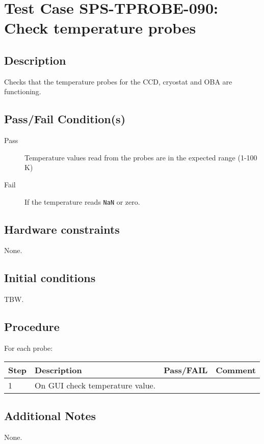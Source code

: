 \section{Test Case SPS-TPROBE-090: Check temperature probes}

\subsection{Description}

Checks that the temperature probes for the CCD, cryostat and OBA are functioning.

\subsection{Pass/Fail Condition(s)}

\begin{description}
\item [Pass] Temperature values read from the probes are in the expected range (1-100 K)
\item [Fail] If the temperature reads \texttt{NaN} or zero.
\end{description}

\subsection{Hardware constraints}

None.

\subsection{Initial conditions}

TBW.

\subsection{Procedure}

For each probe:

\begin{table}[H]
    \begin{tabular}{|l| p{5cm} |l| p{5cm} |}
    \hline
    {\bf Step} & {\bf Description} & {\bf Pass/FAIL} & {\bf Comment}  \\ \hline
    1 & On GUI check temperature value. &  &  \\ \hline
    \end{tabular}
\end{table}

\subsection{Additional Notes}

None.